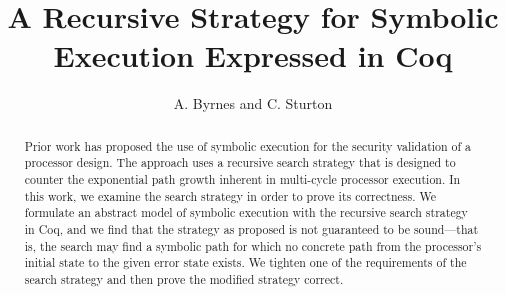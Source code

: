 \documentclass[runningheads]{llncs}
\begin{document}
\title{A Recursive Strategy for Symbolic Execution Expressed in Coq}
\author{A. Byrnes and C. Sturton}




\maketitle

\begin{abstract}
Prior work has proposed the use of symbolic execution for the security
validation of a processor design. The approach uses a recursive search strategy
that is designed to counter the exponential path growth inherent in multi-cycle
processor execution. In this work, we examine the search strategy in order to
prove its correctness. We formulate an abstract model of symbolic execution with
the recursive search strategy in Coq, and we find that the
strategy as proposed is not guaranteed to be sound---that is, the
search may find a symbolic path for which no concrete path from the processor's initial state
to the given error state exists. We tighten one of the requirements of the
search strategy and then prove the modified strategy correct. 
\end{abstract}






%




%




\end{document}
